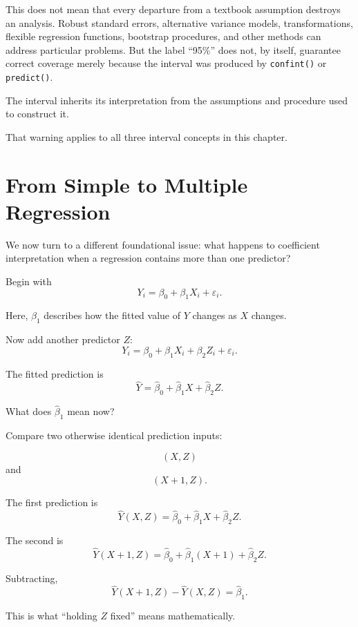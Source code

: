 \documentclass[11pt]{report}
\begin{document}
This does not mean that every departure from a textbook assumption destroys an analysis. Robust standard errors, alternative variance models, transformations, flexible regression functions, bootstrap procedures, and other methods can address particular problems. But the label ``95\%'' does not, by itself, guarantee correct coverage merely because the interval was produced by \texttt{confint()} or \texttt{predict()}.

The interval inherits its interpretation from the assumptions and procedure used to construct it.

That warning applies to all three interval concepts in this chapter.

\section{From Simple to Multiple Regression}

We now turn to a different foundational issue: what happens to coefficient interpretation when a regression contains more than one predictor?

Begin with
\[
Y_i
=
\beta_0+\beta_1X_i+\varepsilon_i.
\]

Here, \(\beta_1\) describes how the fitted value of \(Y\) changes as \(X\) changes.

Now add another predictor \(Z\):
\[
Y_i
=
\beta_0+\beta_1X_i+\beta_2Z_i+\varepsilon_i.
\]

The fitted prediction is
\[
\widehat{Y}
=
\widehat{\beta}_0
+
\widehat{\beta}_1X
+
\widehat{\beta}_2Z.
\]

What does \(\widehat{\beta}_1\) mean now?

Compare two otherwise identical prediction inputs:

\[
(X,Z)
\]
and
\[
(X+1,Z).
\]

The first prediction is
\[
\widehat{Y}(X,Z)
=
\widehat{\beta}_0
+
\widehat{\beta}_1X
+
\widehat{\beta}_2Z.
\]

The second is
\[
\widehat{Y}(X+1,Z)
=
\widehat{\beta}_0
+
\widehat{\beta}_1(X+1)
+
\widehat{\beta}_2Z.
\]

Subtracting,
\[
\widehat{Y}(X+1,Z)
-
\widehat{Y}(X,Z)
=
\widehat{\beta}_1.
\]

This is what ``holding \(Z\) fixed'' means mathematically.

\begin{center}
\end{center}
\end{document}
